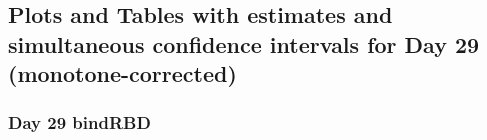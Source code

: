\documentclass[]{article}
\begin{document}
\clearpage
\clearpage

\hypertarget{plots-and-tables-with-estimates-and-simultaneous-confidence-intervals-for-day-29-monotone-corrected}{%
\subsection{Plots and Tables with estimates and simultaneous confidence
intervals for Day 29
(monotone-corrected)}\label{plots-and-tables-with-estimates-and-simultaneous-confidence-intervals-for-day-29-monotone-corrected}}

\clearpage

\hypertarget{day-29-bindrbd-2}{%
\subsubsection{Day 29 bindRBD}\label{day-29-bindrbd-2}}
\end{document}
